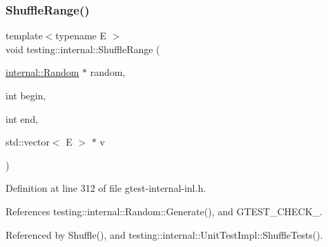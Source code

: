 \subsubsection{\texorpdfstring{Shuffle\+Range()}{ShuffleRange()}}
{\footnotesize\ttfamily template$<$typename E $>$ \\
void testing\+::internal\+::\+Shuffle\+Range (\begin{DoxyParamCaption}\item[{\hyperlink{classtesting_1_1internal_1_1Random}{internal\+::\+Random} $\ast$}]{random,  }\item[{int}]{begin,  }\item[{int}]{end,  }\item[{std\+::vector$<$ E $>$ $\ast$}]{v }\end{DoxyParamCaption})}



Definition at line 312 of file gtest-\/internal-\/inl.\+h.



References testing\+::internal\+::\+Random\+::\+Generate(), and G\+T\+E\+S\+T\+\_\+\+C\+H\+E\+C\+K\+\_\+.



Referenced by Shuffle(), and testing\+::internal\+::\+Unit\+Test\+Impl\+::\+Shuffle\+Tests().


